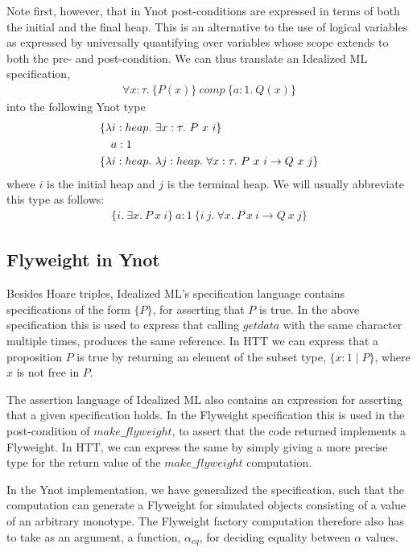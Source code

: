 Note first, however, that in Ynot post-conditions are expressed in terms of
both the initial and the final heap. This is an alternative to the use of
logical variables as expressed by universally quantifying over variables
whose scope extends to both the pre- and post-condition.  We can thus
translate an Idealized ML specification,
{\small\begin{align*}
\forall x : \tau.\ \{ P(x) \}\ comp\ \{ a : 1.\ Q(x) \}
\end{align*}}
into the following Ynot type
{\small\begin{align*}
&\{ \lambda i : \HEAP.\ \exists x : \tau.\ P\ x\ i \}\\
&\quad a : 1\\
&\{ \lambda i : \HEAP.\ \lambda j : \HEAP.\ \forall x : \tau.\ P\ x\ i
\rightarrow Q\ x\ j \}
\end{align*}}
where $i$ is the initial heap and $j$ is the terminal heap. We will usually
abbreviate this type as follows: 
{\small\begin{align*}
\{ i.\ \exists x.\ P\ x\ i \}\ a : 1\ \{ i\ j.\ \forall x.\ P\ x\ i \rightarrow Q\ x\ j \}
\end{align*}}

\subsection{Flyweight in Ynot}
\label{sec:ynot-flyweight}

Besides Hoare triples, Idealized ML's specification language contains
specifications of the form $\{ P \}$, for asserting that $P$ is true. In the
above specification this is used to express that calling $getdata$ with the
same character multiple times, produces the same reference. In HTT we can
express that a proposition $P$ is true by returning an element of
the subset type, $\{ x : 1 \mid P \}$, where $x$ is not free in $P$. 

The assertion language of Idealized ML also contains an expression for
asserting that a given specification holds. In the Flyweight specification
this is used in the post-condition of $make\_flyweight$, to assert that the
code returned implements a Flyweight. In HTT, we can express the same by
simply giving a more precise type for the return value of the
$make\_flyweight$ computation.

In the Ynot implementation, we 
have generalized the specification, such that the computation can
generate a Flyweight for simulated objects consisting of a value of an
arbitrary monotype. The Flyweight factory computation therefore also has to
take as an argument, a function, $\alpha_{eq}$, for deciding 
equality between $\alpha$ values. 

